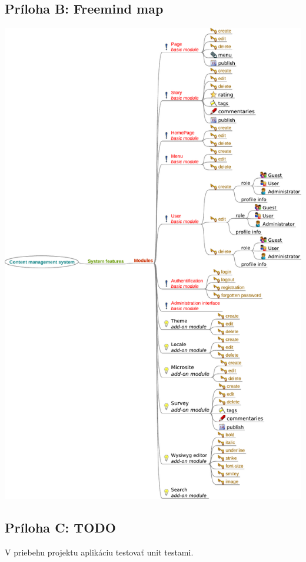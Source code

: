 \documentclass[a4paper,titlepage,11pt]{article}
\begin{document}
\subsection*{Príloha B: Freemind map}
\includegraphics[width=\textwidth]{freemind.pdf}

\subsection*{Príloha C: TODO}
V priebehu projektu aplikáciu testovať unit testami.
\end{document}
